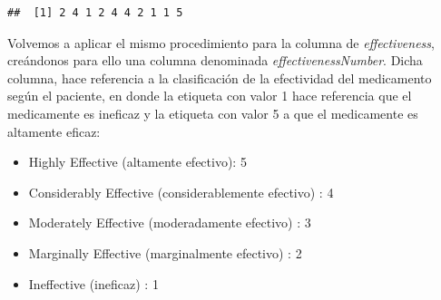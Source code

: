 \documentclass[spanish,]{article}
\newenvironment{Shaded}{\begin{snugshade}}{\end{snugshade}}
\newcommand{\KeywordTok}[1]{\textcolor[rgb]{0.13,0.29,0.53}{\textbf{#1}}}
\newcommand{\DecValTok}[1]{\textcolor[rgb]{0.00,0.00,0.81}{#1}}
\newcommand{\OperatorTok}[1]{\textcolor[rgb]{0.81,0.36,0.00}{\textbf{#1}}}
\newcommand{\NormalTok}[1]{#1}
\providecommand{\tightlist}{%
  \setlength{\itemsep}{0pt}\setlength{\parskip}{0pt}}
\begin{document}
\begin{Shaded}
\end{Shaded}

\begin{verbatim}
##  [1] 2 4 1 2 4 4 2 1 1 5
\end{verbatim}

Volvemos a aplicar el mismo procedimiento para la columna de
\emph{effectiveness}, creándonos para ello una columna denominada
\emph{effectivenessNumber}. Dicha columna, hace referencia a la
clasificación de la efectividad del medicamento según el paciente, en
donde la etiqueta con valor 1 hace referencia que el medicamente es
ineficaz y la etiqueta con valor 5 a que el medicamente es altamente
eficaz:

\begin{itemize}
\tightlist
\item
  Highly Effective (altamente efectivo): 5
\item
  Considerably Effective (considerablemente efectivo) : 4
\item
  Moderately Effective (moderadamente efectivo) : 3
\item
  Marginally Effective (marginalmente efectivo) : 2
\item
  Ineffective (ineficaz) : 1
\end{itemize}
\end{document}
